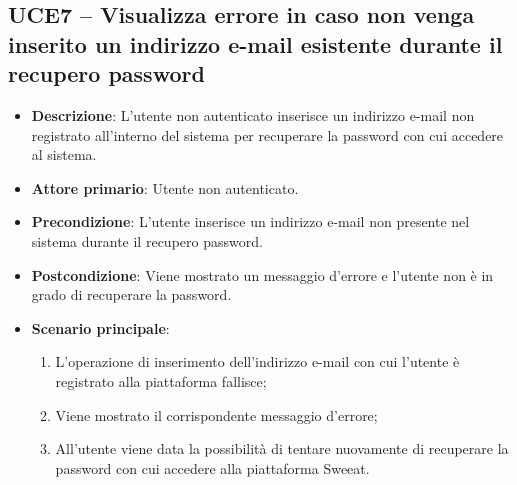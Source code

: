 \subsection{UCE7 – Visualizza errore in caso non venga inserito un indirizzo e-mail esistente durante il recupero password}
\begin{itemize}
\item \textbf{Descrizione}: L'utente non autenticato inserisce un indirizzo e-mail non registrato all'interno del sistema per recuperare la password con cui accedere al sistema.
\item \textbf{Attore primario}: Utente non autenticato.
\item \textbf{Precondizione}: L'utente inserisce un indirizzo e-mail non presente nel sistema durante il recupero password.
\item \textbf{Postcondizione}: Viene mostrato un messaggio d'errore e l'utente non è in grado di recuperare la password.

\item \textbf{Scenario principale}:
\begin{enumerate}
\item L'operazione di inserimento dell'indirizzo e-mail con cui l'utente è registrato alla piattaforma fallisce;
\item Viene mostrato il corrispondente messaggio d'errore;
\item All'utente viene data la possibilità di tentare nuovamente di recuperare la password con cui accedere alla piattaforma Sweeat.
\end{enumerate}
\end{itemize}